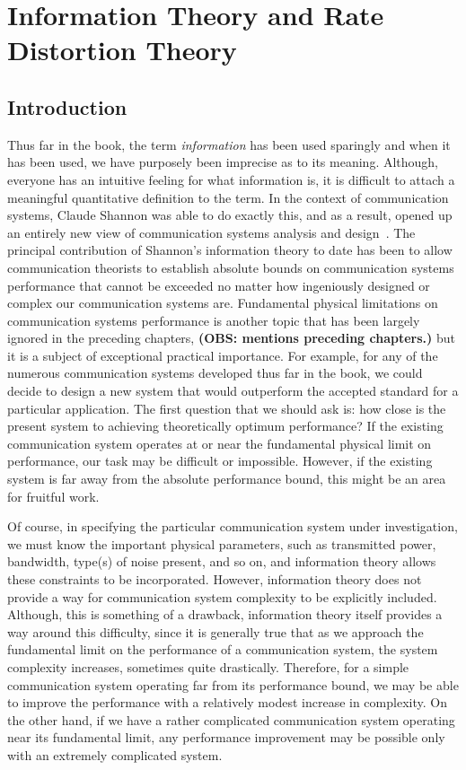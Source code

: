 

\chapter{Information Theory and Rate Distortion Theory}
\label{ch01}


\section{Introduction}
\label{ch01.sec.11.1}

Thus far in the book, the term \textit{information}
has been used sparingly and when
it has been used, we have purposely been imprecise as to its meaning.
Although,
everyone  has an intuitive feeling for what information is,
it is difficult to attach
a meaningful quantitative definition to the term. In the context of
communication systems, Claude Shannon was able to do exactly this,
and as a result, opened up an entirely new view of communication systems
analysis and design~\cite{Levin2002}.
The principal contribution of Shannon's information theory to date has been
to allow communication theorists to establish absolute
bounds on communication systems performance that cannot be exceeded no matter
how ingeniously designed or complex our communication systems are.
Fundamental physical limitations on communication systems performance is
another topic that has been largely ignored in the preceding chapters,
\textbf{(OBS: mentions preceding chapters.)}
but it is a subject of exceptional practical importance.
For example, for any of the numerous communication systems developed
thus far in the book, we could decide to design
a new system that would outperform the accepted standard for a particular
application. The first question that we should ask is: how close is the
present system to achieving theoretically optimum performance?
If the existing communication system operates at or near the fundamental
physical limit on performance, our task may be difficult or impossible.
However, if the existing system is far away from the absolute
performance bound, this might be an area for fruitful work.

Of course, in specifying the particular communication system under
investigation, we must know the important physical parameters,
such as transmitted
power, bandwidth, type(s) of noise present, and so on,
and information theory allows these constraints to be incorporated.
However, information theory does not provide a way for communication system
complexity to be explicitly included.
Although, this is something of a drawback, information theory itself provides
a way around this difficulty, since it is generally true that as we approach
the fundamental limit on the performance of a communication system,
the system complexity increases, sometimes quite drastically.
Therefore, for a simple communication system operating far
from its performance bound, we may be able to improve the performance
with a relatively modest increase in complexity.
On the other hand, if we have a rather complicated communication system
operating near its fundamental limit, any performance improvement may
be possible only with an extremely complicated system.

